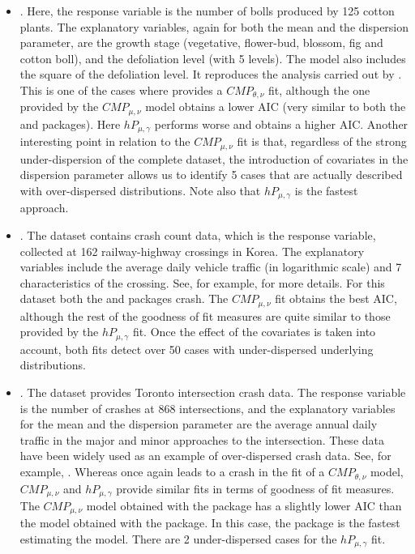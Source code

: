 \begin{itemize}
    \item {}. Here, the response variable is the number of bolls produced by 125 cotton plants. The explanatory variables, again for both the mean and the dispersion parameter, are the growth stage (vegetative, flower-bud, blossom, fig and cotton boll), and the defoliation level (with 5 levels). The model also includes the square of the defoliation level. It reproduces the analysis carried out by \citet{Zeviani14}. This is one of the cases where  provides a $CMP_{\theta, \nu}$ fit, although the one provided by the $CMP_{\mu, \nu}$ model obtains a lower AIC (very similar to both the  and  packages). Here $hP_{\mu, \gamma}$ performs worse and obtains a higher AIC. Another interesting point in relation to the $CMP_{\mu, \nu}$ fit is that, regardless of the strong under-dispersion of the complete dataset, the introduction of covariates in the dispersion parameter allows us to identify 5 cases that are actually described with over-dispersed distributions. Note also that $hP_{\mu, \gamma}$ is the fastest approach.

    \item {}. The dataset contains crash count data, which is the response variable, collected at 162 railway-highway crossings in Korea. The explanatory variables include the average daily vehicle traffic (in logarithmic scale) and 7 characteristics of the crossing. See, for example, \citet{lord} for more details. For this dataset both the  and  packages crash. The $CMP_{\mu, \nu}$ fit obtains the best AIC, although the rest of the goodness of fit measures are quite similar to those provided by the $hP_{\mu, \gamma}$ fit. Once the effect of the covariates is taken into account, both fits detect over 50 cases with under-dispersed underlying distributions.

    \item {}. The dataset provides Toronto intersection crash data. The response variable is the number of crashes at 868 intersections, and the explanatory variables for the mean and the dispersion parameter are the average annual daily traffic in the major and minor approaches to the intersection. These data have been widely used as an example of over-dispersed crash data. See, for example, \citet{lord}. Whereas  once again leads to a crash in the fit of a $CMP_{\theta, \nu}$ model, $CMP_{\mu, \nu}$ and $hP_{\mu, \gamma}$ provide similar fits in terms of goodness of fit measures. The $CMP_{\mu, \nu}$ model obtained with the  package has a slightly lower AIC than the model obtained with the  package. In this case, the  package is the fastest estimating the model. There are 2 under-dispersed cases for the $hP_{\mu, \gamma}$ fit.


\end{itemize}
